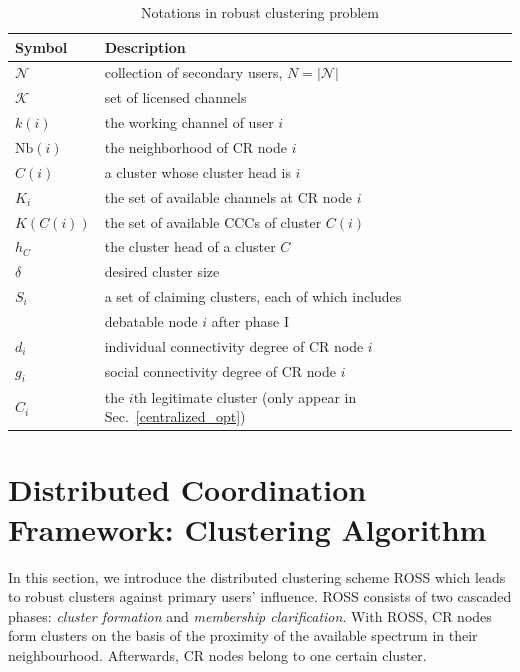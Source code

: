 \documentclass[10pt,journal,compsoc]{IEEEtran}
\theoremstyle{mytheoremstyle}
\theoremstyle{mytheoremstyle}
\theoremstyle{mytheoremstyle}
\begin{document}
\begin{table}[h!]
\caption{Notations in robust clustering problem}
\label{tab1}
\centering
\begin{tabular}{llr}
\toprule
Symbol & Description \\
\midrule
$\mathcal{N}$  & collection of secondary users, $N=|\mathcal{N}|$\\
$\mathcal{K}$	& set of licensed channels\\
$k(i)$ & the working channel of user $i$\\
$\text{Nb}(i)$ & the neighborhood of CR node $i$    \\
$C(i)$ & a cluster whose cluster head is $i$  \\
$K_i$   & the set of available channels at CR node $i$  \\
$K(C(i))$   & the set of available CCCs of cluster $C(i)$ \\
$h_C$ & the cluster head of a cluster $C$\\
$\delta$ & desired cluster size\\
$S_i$ & a set of claiming clusters, each of which includes \\
& debatable node $i$ after phase I\\
$d_i$  & individual connectivity degree of CR node $i$\\
$g_i$  & social connectivity degree of CR node $i$\\
$C_i$  & the $i$th legitimate cluster (only appear in Sec.~\ref{centralized_opt})\\
\bottomrule
\end{tabular}
\end{table}




\section{Distributed Coordination Framework: Clustering Algorithm}
\label{ross}

In this section, we introduce the distributed clustering scheme ROSS which leads to robust clusters against primary users' influence.
ROSS consists of two cascaded phases: \textit{cluster formation} and \textit{membership clarification}.
With ROSS, CR nodes form clusters on the basis of the proximity of the available spectrum in their neighbourhood. Afterwards, CR nodes belong to one certain cluster. %
	
\end{document}
